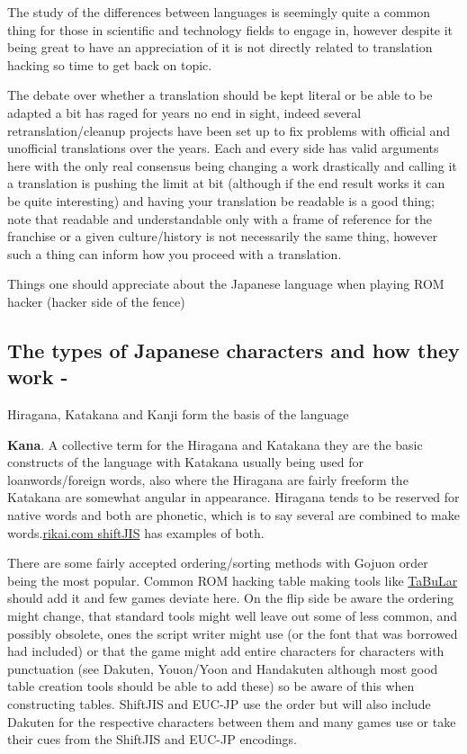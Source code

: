 \documentclass[
]{book}
\begin{document}
The study of the differences between languages is seemingly quite a common thing for those in scientific and technology fields to engage in, however despite it being great to have an appreciation of it is not directly related to translation hacking so time to get back on topic.

The debate over whether a translation should be kept literal or be able to be adapted a bit has raged for years no end in sight, indeed several retranslation/cleanup projects have been set up to fix problems with official and unofficial translations over the years. Each and every side has valid arguments here with the only real consensus being changing a work drastically and calling it a translation is pushing the limit at bit (although if the end result works it can be quite interesting) and having your translation be readable is a good thing; note that readable and understandable only with a frame of reference for the franchise or a given culture/history is not necessarily the same thing, however such a thing can inform how you proceed with a translation.

Things one should appreciate about the Japanese language when playing ROM hacker (hacker side of the fence)

\hypertarget{the-types-of-japanese-characters-and-how-they-work--}{%
\subsection{The types of Japanese characters and how they work -}\label{the-types-of-japanese-characters-and-how-they-work--}}

Hiragana, Katakana and Kanji form the basis of the language

\textbf{Kana}. A collective term for the Hiragana and Katakana they are the basic constructs of the language with Katakana usually being used for loanwords/foreign words, also where the Hiragana are fairly freeform the Katakana are somewhat angular in appearance. Hiragana tends to be reserved for native words and both are phonetic, which is to say several are combined to make words.\href{http://www.rikai.com/library/kanjitables/kanji_codes.sjis.shtml}{rikai.com shiftJIS} has examples of both.

There are some fairly accepted ordering/sorting methods with Gojuon order being the most popular. Common ROM hacking table making tools like \href{http://www.romhacking.net/utilities/55/}{TaBuLar} should add it and few games deviate here. On the flip side be aware the ordering might change, that standard tools might well leave out some of less common, and possibly obsolete, ones the script writer might use (or the font that was borrowed had included) or that the game might add entire characters for characters with punctuation (see Dakuten, Youon/Yoon and Handakuten although most good table creation tools should be able to add these) so be aware of this when constructing tables. ShiftJIS and EUC-JP use the order but will also include Dakuten for the respective characters between them and many games use or take their cues from the ShiftJIS and EUC-JP encodings.
\end{document}
